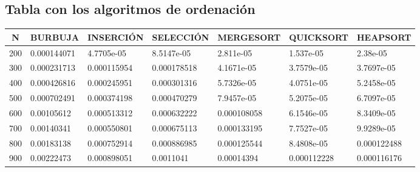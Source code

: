 \documentclass[11pt,spanish]{article} %
\begin{document}
\subsection{Tabla con los algoritmos de ordenaci\'on}
\begin{center}
\begin{longtable}{|c|l|l|l|l|l|l|}
\hline
N    & \multicolumn{1}{c|}{BURBUJA} & \multicolumn{1}{c|}{INSERCIÓN} & \multicolumn{1}{c|}{SELECCIÓN} & \multicolumn{1}{c|}{MERGESORT} & \multicolumn{1}{c|}{QUICKSORT} & \multicolumn{1}{c|}{HEAPSORT} \\ \hline
200  & 0.000144071                  & 4.7705e-05                     & 8.5147e-05                     & 2.811e-05                      & 1.537e-05                      & 2.38e-05                      \\ \hline
300  & 0.000231713                  & 0.000115954                    & 0.000178518                    & 4.1671e-05                     & 3.7579e-05                     & 3.7697e-05                    \\ \hline
400  & 0.000426816                  & 0.000245951                    & 0.000301316                    & 5.7326e-05                     & 4.0751e-05                     & 5.2458e-05                    \\ \hline
500  & 0.000702491                  & 0.000374198                    & 0.000470279                    & 7.9457e-05                     & 5.2075e-05                     & 6.7097e-05                    \\ \hline
600  & 0.00105612                   & 0.000513312                    & 0.000632222                    & 0.000108058                    & 6.1546e-05                     & 8.3409e-05                    \\ \hline
700  & 0.00140341                   & 0.000550801                    & 0.000675113                    & 0.000133195                    & 7.7527e-05                     & 9.9289e-05                    \\ \hline
800  & 0.00183138                   & 0.000752914                    & 0.000886985                    & 0.000125544                    & 8.4808e-05                     & 0.000122488                   \\ \hline
900  & 0.00222473                   & 0.000898051                    & 0.0011041                      & 0.00014394                     & 0.000112228                    & 0.000116176                   \\ \hline

\end{longtable}
\end{center}
\end{document}
